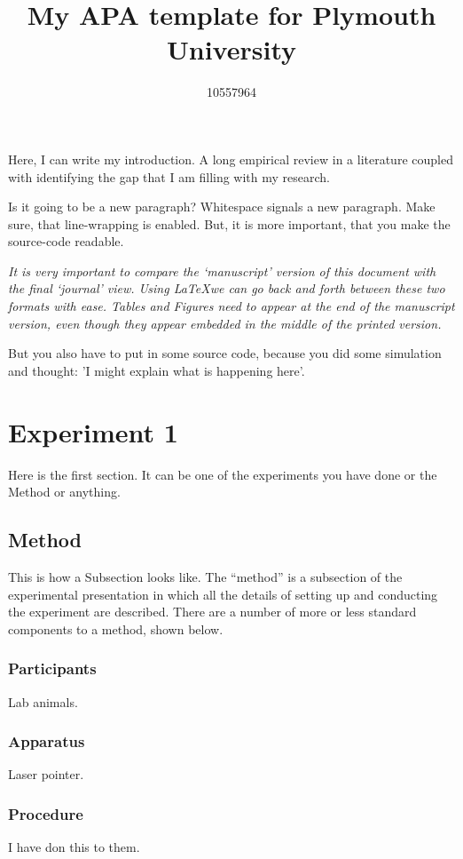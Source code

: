 \documentclass[man]{apa6} %
\title{My APA template for Plymouth University}
\author{10557964}
\affiliation{School of Psychology \\ Plymouth University}
\begin{document}
\maketitle

Here, I can write my introduction. A long empirical review in a literature coupled with identifying the gap that I am filling with my research.

Is it going to be a new paragraph?
Whitespace signals a new paragraph. Make sure, that line-wrapping is enabled. But,
it is more important, that you make the source-code readable.

\emph{It is very important to compare the `manuscript' version of this document with the final `journal' view.  Using \LaTeX we can go back and forth between these two formats with ease.  Tables and Figures need to appear at the end of the manuscript version, even though they appear embedded in the middle of the printed version.  }

But you also have to put in some source code, because you did some simulation and thought: 'I might explain what is happening here'.

\section{Experiment 1}

Here is the first section. It can be one of the experiments you have done or the Method or anything.
\subsection{Method}

This is how a Subsection looks like.
The ``method'' is a subsection of the experimental presentation in which all the details of setting up and conducting the experiment are described.  There are a number of more or less standard components to a method, shown below.  %

%
\subsubsection{Participants}
Lab animals.
\subsubsection{Apparatus}
Laser pointer.
\subsubsection{Procedure}
I have don this to them.
\end{document}
